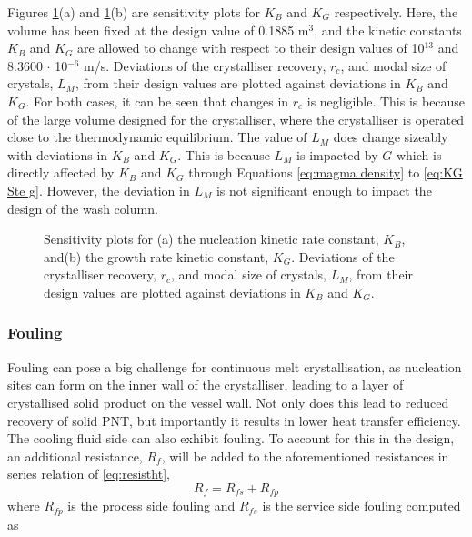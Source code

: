 Figures \ref{fig:sensitivity kinetics}(a) and \ref{fig:sensitivity kinetics}(b) are sensitivity plots for $K_B$ and $K_G$ respectively. Here, the volume has been fixed at the design value of 0.1885 m$^3$, and the kinetic constants $K_B$ and $K_G$ are allowed to change with respect to their design values of 10$^{13}$ and 8.3600 $\cdot$ 10$^{-6}$ m/s. Deviations of the crystalliser recovery, $r_c$, and modal size of crystals, $L_M$, from their design values are plotted against deviations in $K_B$ and $K_G$. For both cases, it can be seen that changes in $r_c$ is negligible. This is because of the large volume designed for the crystalliser, where the crystalliser is operated close to the thermodynamic equilibrium. The value of $L_M$ does change sizeably with deviations in $K_B$ and $K_G$. This is because $L_M$ is impacted by $G$ which is directly affected by $K_B$ and $K_G$ through Equations \ref{eq:magma density} to \ref{eq:KG Ste g}. However, the deviation in $L_M$ is not significant enough to impact the design of the wash column. 

\begin{figure}[h]
    \centering
    
    \caption{Sensitivity plots for (a) the nucleation kinetic rate constant, $K_B$, and(b) the growth rate kinetic constant, $K_G$. Deviations of the crystalliser recovery, $r_c$, and modal size of crystals, $L_M$, from their design values are plotted against deviations in $K_B$ and $K_G$. }
    \label{fig:sensitivity kinetics}
\end{figure}
   
\subsubsection{Fouling}\label{sec:fouling}


Fouling can pose a big challenge for continuous melt crystallisation, as nucleation sites can form on the inner wall of the crystalliser, leading to a layer of crystallised solid product on the vessel wall. Not only does this lead to reduced recovery of solid PNT, but importantly it results in lower heat transfer efficiency. The cooling fluid side can also exhibit fouling. To account for this in the design, an additional resistance, $R_f$, will be added to the aforementioned resistances in series relation of \cref{eq:resistht},
\begin{equation} \label{eq:fouling}
    R_f = R_{fs} + R_{fp}
\end{equation}
where $R_{fp}$ is the process side fouling and $R_{fs}$ is the service side fouling computed as 

